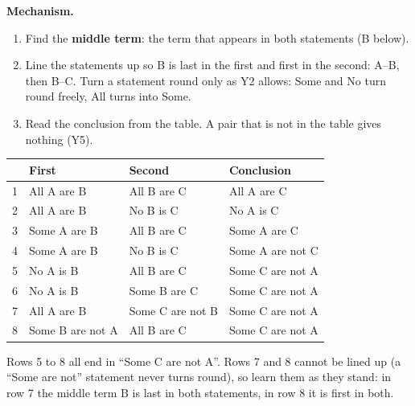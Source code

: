 \documentclass[11pt,a4paper]{article}
\newcommand{\mech}{\textbf{\color{ember}Mechanism.}\ }
\begin{document}
\mech
\begin{enumerate}
\item Find the \textbf{middle term}: the term that appears in both statements (B below).
\item Line the statements up so B is last in the first and first in the second: A--B, then B--C. Turn a statement round only as Y2 allows: Some and No turn round freely, All turns into Some.
\item Read the conclusion from the table. A pair that is not in the table gives nothing (Y5).
\end{enumerate}
\begin{center}\small\renewcommand{\arraystretch}{1.18}\setlength{\tabcolsep}{9pt}
\begin{tabular}{@{}rlll@{}}
\toprule
 & \textbf{\color{slate}First} & \textbf{\color{slate}Second} & \textbf{\color{slate}Conclusion} \\ \midrule
1 & All A are B & All B are C & All A are C \\
2 & All A are B & No B is C & No A is C \\
3 & Some A are B & All B are C & Some A are C \\
4 & Some A are B & No B is C & Some A are not C \\
5 & No A is B & All B are C & Some C are not A \\
6 & No A is B & Some B are C & Some C are not A \\
7 & All A are B & Some C are not B & Some C are not A \\
8 & Some B are not A & All B are C & Some C are not A \\
\bottomrule
\end{tabular}\end{center}
Rows 5 to 8 all end in ``Some C are not A''. Rows 7 and 8 cannot be lined up (a ``Some are not'' statement never turns round), so learn them as they stand: in row 7 the middle term B is last in both statements, in row 8 it is first in both.
\end{document}

